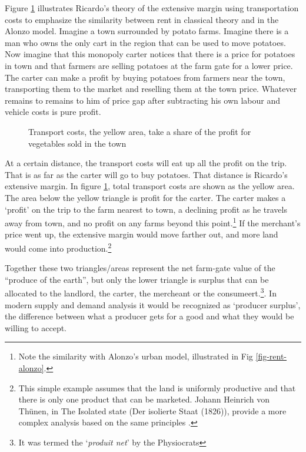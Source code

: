 Figure \ref{fig-rent-ricardo} illustrates Ricardo's theory of the extensive margin using transportation costs to emphasize the similarity between rent in classical theory and in  the Alonzo model. Imagine a town surrounded by potato farms. Imagine there is a man who owns the only cart in the region that can be used to move potatoes. Now imagine that this monopoly carter notices that there is a price for potatoes in town and that farmers are selling potatoes at the farm gate for a lower price. The carter can  make a profit by buying potatoes from farmers near the town, transporting them to the market  and reselling them  at the town price. Whatever remains to remains to him of price gap after subtracting his own labour and vehicle costs is pure profit.  

\begin{figure}[htb]
    \begin{center}
    
    \caption{Transport costs, the yellow area, take a share of the profit for vegetables sold in the town}
    \label{fig-rent-ricardo}
    \end{center}
\end{figure}

At a certain distance, the transport costs will eat up all the profit on the trip. That is as far as the carter will go to buy potatoes. That distance is Ricardo's extensive margin. In figure \ref{fig-rent-ricardo}, total transport costs are shown as the yellow area. The area below the yellow triangle is profit for the carter. The carter makes a `profit' on the trip to the farm nearest to town, a declining profit as he travels away from town, and  no profit on any farms beyond this point.\footnote{Note the similarity with Alonzo's urban model, illustrated in Fig \ref{fig-rent-alonzo}.}
If the merchant's price went up, the extensive margin would move farther out, and more land would come into production.\footnote{This simple example assumes that the land is uniformly productive and that there is only one product that can be marketed. Johann Heinrich von Th\"unen, in The Isolated state (Der isolierte Staat (1826)), provide a more complex analysis based on the same principles \cite{GET_Johann_Heinrich}.} 

Together these two triangles/areas represent the net farm-gate value of the ``produce of the earth'', but only the lower triangle is surplus that can be allocated to the landlord, the carter, the mercheant or the consumeert.\footnote{It was termed the `\textit{produit net}' by the Physiocrats}. In modern supply and demand analysis it would be recognized as `producer surplus', the difference between what a producer gets for a good and what they would be willing to accept.

